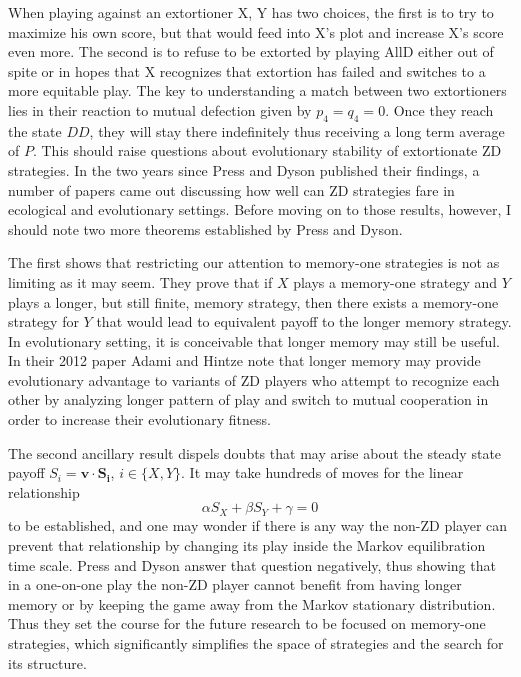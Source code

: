 When playing against an extortioner X, Y has two choices, the first is to try to maximize his own score, but that would feed into X's plot and increase X's score even more. The second is to refuse to be extorted by playing AllD either out of spite or in hopes that X recognizes that extortion has failed and switches to a more equitable play. The key to understanding a match between two extortioners lies in their reaction to mutual defection given by $p_4 = q_4 = 0$. Once they reach the state $DD$, they will stay there indefinitely thus receiving a long term average of $P$. This should raise questions about evolutionary stability of extortionate ZD strategies. In the two years since Press and Dyson published their findings, a number of papers came out discussing how well can ZD strategies fare in ecological and evolutionary settings. Before moving on to those results, however, I should note two more theorems established by Press and Dyson.

The first shows that restricting our attention to memory-one strategies is not as limiting as it may seem. They prove that if $X$ plays a memory-one strategy and $Y$ plays a longer, but still finite, memory strategy, then there exists a memory-one strategy for $Y$ that would lead to equivalent payoff to the longer memory strategy. In evolutionary setting, it is conceivable that longer memory may still be useful. In their 2012 paper Adami and Hintze \cite{Adami_Hintze_2014} note that longer memory may provide evolutionary advantage to variants of ZD players who attempt to recognize each other by analyzing longer pattern of play and switch to mutual cooperation in order to increase their evolutionary fitness.

The second ancillary result dispels doubts that may arise about the steady state payoff $S_i = \mathbf{v}\cdot \mathbf{S_i}$, $i \in \{X, Y\}$. It may take hundreds of moves for the linear relationship
\[
\alpha S_X + \beta S_Y + \gamma = 0
\]
to be established, and one may wonder if there is any way the non-ZD player can prevent that relationship by changing its play inside the Markov equilibration time scale. Press and Dyson answer that question negatively, thus showing that in a one-on-one play the non-ZD player cannot benefit from having longer memory or by keeping the game away from the Markov stationary distribution. Thus they set the course for the future research to be focused on memory-one strategies, which significantly simplifies the space of strategies and the search for its structure.

